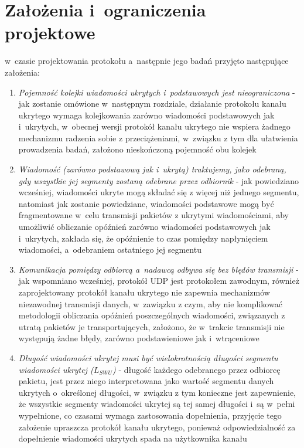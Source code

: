 \documentclass[a4paper, twoside, 12pt]{report}
\begin{document}
    \section{Założenia i~ograniczenia projektowe}
    w~czasie projektowania protokołu a~następnie jego badań przyjęto następujące założenia:
    \begin{enumerate}
        \item \emph{Pojemność kolejki wiadomości ukrytych i~podstawowych jest nieograniczona} -
            jak zostanie omówione w~następnym rozdziale, działanie protokołu
            kanału ukrytego wymaga kolejkowania zarówno wiadomości podstawowych
            jak i~ukrytych, w~obecnej wersji protokół kanału ukrytego nie wspiera
            żadnego mechanizmu radzenia sobie z przeciążeniami, w~związku z tym
            dla ułatwienia prowadzenia badań, założono nieskończoną pojemność obu kolejek

        \item \emph{Wiadomość (zarówno podstawową jak i~ukrytą) traktujemy, jako odebraną,
            gdy wszystkie jej segmenty zostaną odebrane przez odbiornik} - jak powiedziano
            wcześniej, wiadomości ukryte mogą składać się z więcej niż jednego segmentu,
            natomiast jak zostanie powiedziane, wiadomości podstawowe mogą być fragmentowane
            w~celu transmisji pakietów z ukrytymi wiadomościami, aby umożliwić
            obliczanie opóźnień zarówno wiadomości podstawowych jak i~ukrytych,
            zakłada się, że opóźnienie to czas pomiędzy napłynięciem wiadomości,
            a~odebraniem ostatniego jej segmentu

        \item \emph{Komunikacja pomiędzy odbiorcą a~nadawcą odbywa się bez błędów transmisji} -
            jak wspomniano wcześniej, protokół UDP jest protokołem zawodnym, również
            zaprojektowany protokół kanału ukrytego nie zapewnia mechanizmów niezawodnej
            transmisji danych, w~zawiązku z czym, aby nie komplikować metodologii
            obliczania opóźnień poszczególnych wiadomości, związanych z utratą
            pakietów je transportujących, założono, że w~trakcie transmisji nie
            występują żadne błędy, zarówno podstawieniowe jak i~wtrąceniowe

        \item \emph{Długość wiadomości ukrytej musi być wielokrotnością długości segmentu
            wiadomości ukrytej (\(L_{SWU}\))} - długość każdego odebranego przez odbiorcę pakietu,
            jest przez niego interpretowana jako wartość segmentu danych ukrytych o~określonej
            długości, w~związku z tym konieczne jest zapewnienie, że wszystkie segmenty
            wiadomości ukrytej są tej samej długości i~są w~pełni wypełnione, co czasami
            wymaga zastosowania dopełnienia, przyjęcie tego założenie upraszcza protokół
            kanału ukrytego, ponieważ odpowiedzialność za dopełnienie wiadomości ukrytych
            spada na użytkownika kanału
    \end{enumerate}
\end{document}
